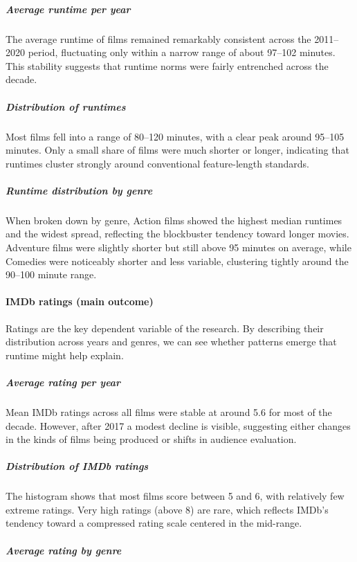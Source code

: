 \documentclass[
]{article}
\begin{document}
\subparagraph{Average runtime per year}\label{average-runtime-per-year}

The average runtime of films remained remarkably consistent across the
2011--2020 period, fluctuating only within a narrow range of about
97--102 minutes. This stability suggests that runtime norms were fairly
entrenched across the decade.

\subparagraph{Distribution of runtimes}\label{distribution-of-runtimes}

Most films fell into a range of 80--120 minutes, with a clear peak
around 95--105 minutes. Only a small share of films were much shorter or
longer, indicating that runtimes cluster strongly around conventional
feature-length standards.

\subparagraph{Runtime distribution by
genre}\label{runtime-distribution-by-genre}

When broken down by genre, Action films showed the highest median
runtimes and the widest spread, reflecting the blockbuster tendency
toward longer movies. Adventure films were slightly shorter but still
above 95 minutes on average, while Comedies were noticeably shorter and
less variable, clustering tightly around the 90--100 minute range.

\paragraph{IMDb ratings (main outcome)}\label{imdb-ratings-main-outcome}

Ratings are the key dependent variable of the research. By describing
their distribution across years and genres, we can see whether patterns
emerge that runtime might help explain.

\subparagraph{Average rating per year}\label{average-rating-per-year}

Mean IMDb ratings across all films were stable at around 5.6 for most of
the decade. However, after 2017 a modest decline is visible, suggesting
either changes in the kinds of films being produced or shifts in
audience evaluation.

\subparagraph{Distribution of IMDb
ratings}\label{distribution-of-imdb-ratings}

The histogram shows that most films score between 5 and 6, with
relatively few extreme ratings. Very high ratings (above 8) are rare,
which reflects IMDb's tendency toward a compressed rating scale centered
in the mid-range.

\subparagraph{Average rating by genre}\label{average-rating-by-genre}
\end{document}
